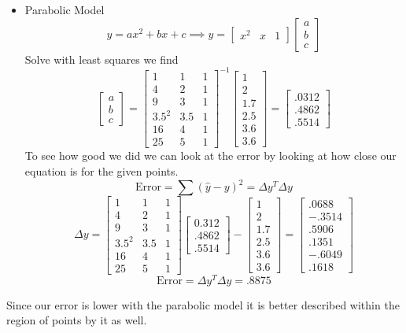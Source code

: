 \documentclass{article}
\begin{document}
\begin{itemize}
\item Parabolic Model
\newline
$$y = ax^2+bx+c \implies y = \begin{bmatrix}x^2 & x & 1 \end{bmatrix} \begin{bmatrix} a \\ b \\ c \end{bmatrix} $$
Solve with least squares we find
$$
\begin{bmatrix} a \\ b \\ c\end{bmatrix}
=
\begin{bmatrix}
1  & 1 &  1 \\
4  & 2 &  1 \\
9  & 3 &  1 \\
3.5^2& 3.5& 1 \\
16 & 4 &  1 \\
25 & 5 &  1
\end{bmatrix}
^{-1}
\begin{bmatrix}
1 \\
2 \\
1.7\\
2.5\\
3.6\\
3.6
\end{bmatrix}
=
\begin{bmatrix} .0312 \\ .4862 \\ .5514 \end{bmatrix}
$$
To see how good we did we can look at the error by looking at how close our equation is for the given points.
$$
\text{Error} = \sum{(\hat{y} - y)^2} = \Delta{y}^T\Delta{y}
$$
$$
\Delta{y} =
\begin{bmatrix}
1  & 1 &  1 \\
4  & 2 &  1 \\
9  & 3 &  1 \\
3.5^2& 3.5& 1 \\
16 & 4 &  1 \\
25 & 5 &  1
\end{bmatrix}
\begin{bmatrix} 0.312 \\ .4862 \\ .5514 \end{bmatrix}
-
\begin{bmatrix}
1 \\
2 \\
1.7\\
2.5\\
3.6\\
3.6
\end{bmatrix}
=
\begin{bmatrix}
.0688\\
-.3514 \\
.5906\\
.1351\\
-.6049\\
.1618
\end{bmatrix}
$$
$$ \text{Error} = \Delta{y}^T\Delta{y}= .8875 $$
\end{itemize}
Since our error is lower with the parabolic model it is better described within the region of points by it as well.
\end{document}
